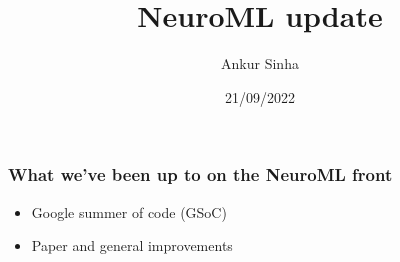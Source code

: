 
\usepackage{color}
\usepackage{tipa}
\usepackage[scale=2]{ccicons}
\usepackage{amssymb}
\usepackage{jneurosci}
\usepackage{subcaption}
\usepackage[T1]{fontenc}
\usepackage[utf8]{inputenc}
% 
\usepackage[sfdefault]{roboto}
\usepackage[normalem]{ulem}
\usepackage{hyperref}
\hypersetup{colorlinks,linkcolor=Green,urlcolor=links}
\usepackage{graphicx}
\usepackage{algorithmic}
\usepackage{textcomp}
\usepackage{wrapfig}
\usepackage{textgreek}
\usepackage{euler}
\usepackage{tabularx}
\usepackage{booktabs}
\usepackage{minted}
\usepackage{csquotes}


\renewcommand{\footnoterule}{}

\title{NeuroML update}
\author[Ankur Sinha]{Ankur Sinha}
\date{21/09/2022}




\begin{frame}
  \titlepage{}
\end{frame}
\begin{frame}[c]
  \frametitle{What we've been up to on the NeuroML front}
  \begin{itemize}
    \item Google summer of code (GSoC)
    \item Paper and general improvements
  \end{itemize}
\end{frame}
